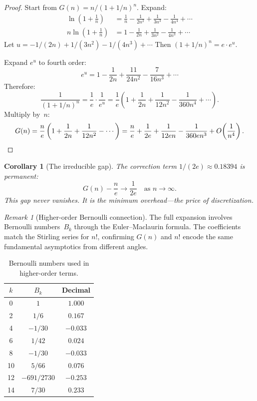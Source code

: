 \documentclass[11pt,a4paper]{article}
\newtheorem{corollary}[theorem]{Corollary}
\theoremstyle{definition}
\theoremstyle{remark}
\newtheorem{remark}[theorem]{Remark}
\begin{document}
\begin{proof}
Start from $G(n) = n/(1+1/n)^{n}$. Expand:
\begin{align}
  \ln\!\left(1+\frac{1}{n}\right) &= \frac{1}{n} - \frac{1}{2n^{2}} + \frac{1}{3n^{3}} - \frac{1}{4n^{4}} + \cdots \label{eq:lnexp}\\
  n\ln\!\left(1+\frac{1}{n}\right) &= 1 - \frac{1}{2n} + \frac{1}{3n^{2}} - \frac{1}{4n^{3}} + \cdots \label{eq:nlnexp}
\end{align}
Let $u = -1/(2n) + 1/(3n^{2}) - 1/(4n^{3}) + \cdots$ Then $(1+1/n)^{n} = e\cdot e^{u}$.

Expand $e^{u}$ to fourth order:
\[
  e^{u} = 1 - \frac{1}{2n} + \frac{11}{24n^{2}} - \frac{7}{16n^{3}} + \cdots
\]
Therefore:
\[
  \frac{1}{(1+1/n)^{n}} = \frac{1}{e}\cdot\frac{1}{e^{u}} = \frac{1}{e}\left(1 + \frac{1}{2n} + \frac{1}{12n^{2}} - \frac{1}{360n^{4}} + \cdots\right).
\]
Multiply by~$n$:
\[
  G(n) = \frac{n}{e}\left(1 + \frac{1}{2n} + \frac{1}{12n^{2}} - \cdots\right) = \frac{n}{e} + \frac{1}{2e} + \frac{1}{12en} - \frac{1}{360en^{3}} + O\!\left(\frac{1}{n^{4}}\right).
  \qedhere
\]
\end{proof}

\begin{corollary}[The irreducible gap]\label{cor:gap}
The correction term $1/(2e) \approx 0.18394$ is permanent:
\begin{equation}\label{eq:gap}
  G(n) - \frac{n}{e} \to \frac{1}{2e} \quad\text{as } n \to \infty.
\end{equation}
This gap never vanishes. It is the minimum overhead---the price of discretization.
\end{corollary}

\begin{remark}[Higher-order Bernoulli connection]\label{rem:bernoulli}
The full expansion involves Bernoulli numbers~$B_k$ through the Euler--Maclaurin formula. The coefficients match the Stirling series for $n!$, confirming $G(n)$ and $n!$ encode the same fundamental asymptotics from different angles.
\end{remark}

\begin{table}[ht]
\centering
\caption{Bernoulli numbers used in higher-order terms.}\label{tab:bernoulli}
\begin{tabular}{ccc}
\toprule
$k$ & $B_k$ & Decimal \\
\midrule
0  & $1$         & $1.000$  \\
2  & $1/6$       & $0.167$  \\
4  & $-1/30$     & $-0.033$ \\
6  & $1/42$      & $0.024$  \\
8  & $-1/30$     & $-0.033$ \\
10 & $5/66$      & $0.076$  \\
12 & $-691/2730$ & $-0.253$ \\
14 & $7/30$      & $0.233$  \\
\bottomrule
\end{tabular}
\end{table}
\end{document}
